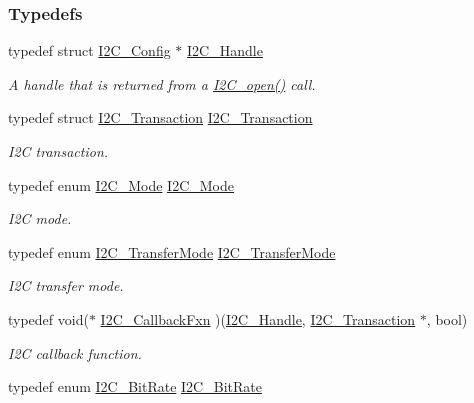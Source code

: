 \subsubsection*{Typedefs}
\begin{DoxyCompactItemize}
\item 
typedef struct \hyperlink{struct_i2_c___config}{I2\-C\-\_\-\-Config} $\ast$ \hyperlink{_i2_c_8h_a5809a229f8395c87f59e63128195c1bf}{I2\-C\-\_\-\-Handle}
\begin{DoxyCompactList}\small\item\em A handle that is returned from a \hyperlink{_i2_c_8h_ae1aa99e1fee4517406018e10025cca0e}{I2\-C\-\_\-open()} call. \end{DoxyCompactList}\item 
typedef struct \hyperlink{struct_i2_c___transaction}{I2\-C\-\_\-\-Transaction} \hyperlink{_i2_c_8h_a54d2d506a10628451340a2901bdb6277}{I2\-C\-\_\-\-Transaction}
\begin{DoxyCompactList}\small\item\em I2\-C transaction. \end{DoxyCompactList}\item 
typedef enum \hyperlink{_i2_c_8h_ac8f0941a68f18f5d1743a21ab32c7929}{I2\-C\-\_\-\-Mode} \hyperlink{_i2_c_8h_ae55a8b6a859a48b93b7ad0472da42fcc}{I2\-C\-\_\-\-Mode}
\begin{DoxyCompactList}\small\item\em I2\-C mode. \end{DoxyCompactList}\item 
typedef enum \hyperlink{_i2_c_8h_a39f3b9340fc4ee241b0d2da9b2841c26}{I2\-C\-\_\-\-Transfer\-Mode} \hyperlink{_i2_c_8h_a74176ca6d49d4081eeacb270a8e9c800}{I2\-C\-\_\-\-Transfer\-Mode}
\begin{DoxyCompactList}\small\item\em I2\-C transfer mode. \end{DoxyCompactList}\item 
typedef void($\ast$ \hyperlink{_i2_c_8h_a5ece918abf136397f682df3924441634}{I2\-C\-\_\-\-Callback\-Fxn} )(\hyperlink{_i2_c_8h_a5809a229f8395c87f59e63128195c1bf}{I2\-C\-\_\-\-Handle}, \hyperlink{struct_i2_c___transaction}{I2\-C\-\_\-\-Transaction} $\ast$, bool)
\begin{DoxyCompactList}\small\item\em I2\-C callback function. \end{DoxyCompactList}\item 
typedef enum \hyperlink{_i2_c_8h_ac954e3197f04c50293db466c4abb6fbe}{I2\-C\-\_\-\-Bit\-Rate} \hyperlink{_i2_c_8h_a4614c71f39459a9cc729b1f183d795f3}{I2\-C\-\_\-\-Bit\-Rate}

\end{DoxyCompactItemize}

